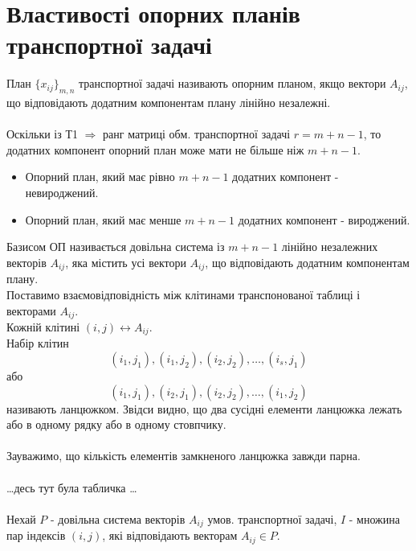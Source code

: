 \documentclass[12pt]{book}
\begin{document}
\section{Властивості опорних планів транспортної задачі}
План $\{x_{ij}\}_{m,n}$ транспортної задачі називають опорним планом, якщо вектори $A_{ij}$, що відповідають додатним компонентам плану лінійно незалежні.\\
\\
Оскільки із Т1 $\Rightarrow$ ранг матриці обм. транспортної задачі $r=m+n-1$, то додатних компонент опорний план може мати не більше ніж $m+n-1$.
\begin{itemize}
\item Опорний план, який має рівно $m+n-1$ додатних компонент - невироджений.
\item Опорний план, який має менше $m+n-1$ додатних компонент - вироджений.
\end{itemize}
Базисом ОП називається довільна система із $m+n-1$ лінійно незалежних векторів $A_{ij}$, яка містить усі вектори $A_{ij}$, що відповідають додатним компонентам плану.\\
Поставимо взаємовідповідність між клітинами транспонованої таблиці і векторами $A_{ij}$.\\
Кожній клітині $(i,j){\leftrightarrow}A_{ij}$.\\
Набір клітин $$(i_1,j_1),(i_1,j_2),(i_2,j_2),\dots,(i_s,j_1)$$або$$(i_1,j_1),(i_2,j_1),(i_2,j_2),\dots,(i_1,j_2)$$
називають ланцюжком. Звідси видно, що два сусідні елементи ланцюжка лежать або в одному рядку або в одному стовпчику.\\
\\
Зауважимо, що кількість елементів замкненого ланцюжка завжди парна.\\
\\
\dots десь тут була табличка \dots\\
\\
Нехай $P$ - довільна система векторів $A_{ij}$ умов. транспортної задачі, $I$ - множина пар індексів $(i,j)$, які відповідають векторам $A_{ij}{\in}P$.
\end{document}
